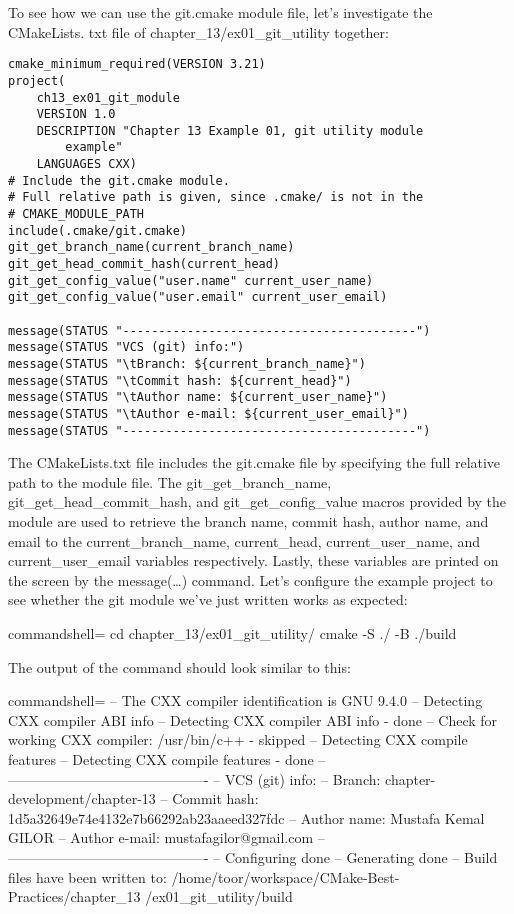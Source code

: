 To see how we can use the git.cmake module file, let's investigate the CMakeLists. txt file of chapter\_13/ex01\_git\_utility together:

\begin{lstlisting}[style=styleCMake]
cmake_minimum_required(VERSION 3.21)
project(
	ch13_ex01_git_module
	VERSION 1.0
	DESCRIPTION "Chapter 13 Example 01, git utility module
		example"
	LANGUAGES CXX)
# Include the git.cmake module.
# Full relative path is given, since .cmake/ is not in the 
# CMAKE_MODULE_PATH
include(.cmake/git.cmake)
git_get_branch_name(current_branch_name)
git_get_head_commit_hash(current_head)
git_get_config_value("user.name" current_user_name)
git_get_config_value("user.email" current_user_email)

message(STATUS "-----------------------------------------")
message(STATUS "VCS (git) info:")
message(STATUS "\tBranch: ${current_branch_name}")
message(STATUS "\tCommit hash: ${current_head}")
message(STATUS "\tAuthor name: ${current_user_name}")
message(STATUS "\tAuthor e-mail: ${current_user_email}")
message(STATUS "-----------------------------------------")
\end{lstlisting}

The CMakeLists.txt file includes the git.cmake file by specifying the full relative path to the module file. The git\_get\_branch\_name, git\_get\_head\_commit\_hash, and git\_get\_config\_value macros provided by the module are used to retrieve the branch name, commit hash, author name, and email to the current\_branch\_name, current\_head, current\_user\_name, and current\_user\_email variables respectively. Lastly, these variables are printed on the screen by the message(…) command. Let's configure the example project to see whether the git module we've just written works as expected:

\begin{tcblisting}{commandshell={}}
cd chapter_13/ex01_git_utility/
cmake -S ./ -B ./build
\end{tcblisting}

The output of the command should look similar to this:

\begin{tcblisting}{commandshell={}}
-- The CXX compiler identification is GNU 9.4.0
-- Detecting CXX compiler ABI info
-- Detecting CXX compiler ABI info - done
-- Check for working CXX compiler: /usr/bin/c++ - skipped
-- Detecting CXX compile features
-- Detecting CXX compile features - done
-- -------------------------------------------
-- VCS (git) info:
-- Branch: chapter-development/chapter-13
-- Commit hash: 1d5a32649e74e4132e7b66292ab23aaeed327fdc
-- Author name: Mustafa Kemal GILOR
-- Author e-mail: mustafagilor@gmail.com
-- -------------------------------------------
-- Configuring done
-- Generating done
-- Build files have been written to:
/home/toor/workspace/CMake-Best-Practices/chapter_13
/ex01_git_utility/build
\end{tcblisting}

